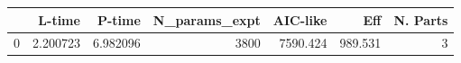 \begin{tabular}{lrrrrrr}
\toprule
{} &    L-time &    P-time &  N\_params\_expt &  AIC-like &      Eff &  N. Parts \\
\midrule
0 &  2.200723 &  6.982096 &           3800 &  7590.424 &  989.531 &         3 \\
\bottomrule
\end{tabular}
